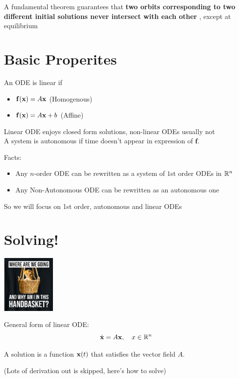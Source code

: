 \documentclass{report}
\begin{document}
A fundamental theorem guarantees 
that \textbf{two orbits corresponding to two different initial solutions never intersect with
each other }, except at equilibrium

\section*{Basic Properites}

An ODE is linear if 
\begin{itemize}
    \item $\mathbf{f}(\mathbf{x}) = A\mathbf{x}$ (Homogenous)
    \item $\mathbf{f}(\mathbf{x}) = A\mathbf{x} + b$ (Affine)
\end{itemize}

Linear ODE enjoys closed form solutions, non-linear ODEs usually not
\\

A system is autonomous if time doesn't appear in expression of $\mathbf{f}$.

Facts:
\begin{itemize}
    \item Any $n$-order ODE can be rewritten as a system of $1$st order ODEs in $\mathbb{R}^n$
    \item Any Non-Autonomous ODE can be rewritten as an autonomous one
\end{itemize}

So we will focus on 1st order, autonomous and linear ODEs

\section*{Solving!}
    \begin{center}
    \includegraphics[width=0.2\textwidth]{images/cat.png}
\end{center}

General form of linear ODE:
\[
\dot{\mathbf{x}} = A \mathbf{x}, \quad x \in \mathbb{R}^n
\]

A solution is a function $\mathbf{x}(t)$ that satisfies the vector field $A$.

(Lots of derivation out is skipped, here's how to solve)
\end{document}
